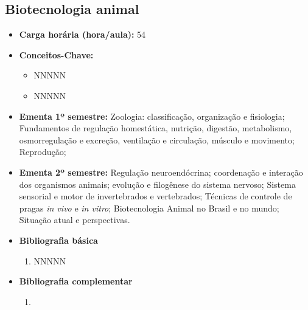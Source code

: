 \documentclass[11pt,fleqn]{book} %
\begin{document}
\subsection{Biotecnologia animal}\label{disc:biotecAnimal}
\begin{itemize}
	\item \textbf{Carga horária (hora/aula):} 54
	\item \textbf{Conceitos-Chave:}
	\begin{itemize}
		\item NNNNN
		\item NNNNN
	\end{itemize}
	\item \textbf{Ementa 1º semestre:}	
	Zoologia: classificação, organização e fisiologia;
	Fundamentos de regulação homestática, nutrição, digestão, metabolismo, osmorregulação e excreção, ventilação e circulação, músculo e movimento;
	Reprodução; 
	\item \textbf{Ementa 2º semestre:}
	Regulação neuroendócrina; coordenação e interação dos organismos animais; evolução e filogênese do sistema nervoso; 
	Sistema sensorial e motor de invertebrados e vertebrados;	
	Técnicas de controle de pragas \textit{in vivo} e \textit{in vitro};
	Biotecnologia Animal no Brasil e no mundo; 
	Situação atual e perspectivas.
	\item \textbf{Bibliografia básica}
	\begin{enumerate}
		\item NNNNN
	\end{enumerate}
	\item \textbf{Bibliografia complementar}
	\begin{enumerate}
		\item 
	\end{enumerate}	
\end{itemize}

\newpage
\end{document}
